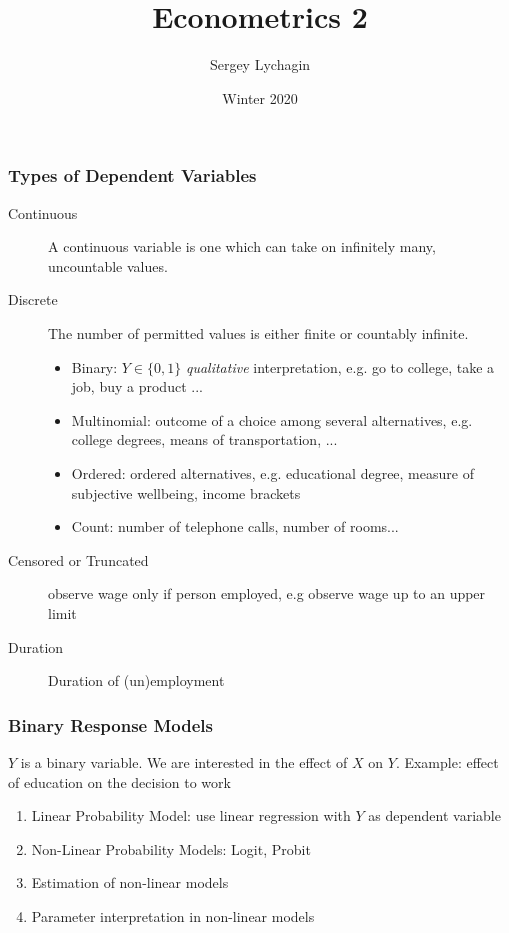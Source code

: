 \documentclass[pdftex]{beamer}
\title[Limited Dependent Variables]{Econometrics 2}
\author[Lychagin \& Mu\c co]{Sergey Lychagin}
\institute[CEU]{Central European University}
\date{Winter 2020}
\begin{document}
\frame{\titlepage}





\begin{frame}
\frametitle{Types of Dependent Variables}

\begin{description}
  \item[Continuous] A continuous variable is one which can take on infinitely many, uncountable values.
    \item[Discrete] The number of permitted values is either finite or countably infinite.
\begin{itemize}\scriptsize
  \item Binary: $Y \in \{0,1\}$ \emph{qualitative} interpretation, e.g. go to college, take a job, buy a product ...
  \item Multinomial: outcome of a choice among several alternatives, e.g. college degrees, means of transportation, ...
  \item Ordered:  ordered alternatives, e.g. educational degree, measure of subjective wellbeing, income brackets
  \item Count: number of telephone calls, number of rooms...
  \end{itemize}

  \item[Censored or Truncated] observe wage only if person employed, e.g  observe wage up to an upper limit
  \item[Duration] Duration of (un)employment
\end{description}
\end{frame}






\begin{frame}
\frametitle{Binary Response Models}

$Y$ is a binary variable. We are interested in the effect of $X$ on $Y$.
Example: effect of education on the decision to work

\begin{enumerate}
  \item Linear Probability Model: use linear regression with $Y$ as dependent variable
  \item Non-Linear Probability Models: Logit, Probit
  \item Estimation of non-linear models
  \item Parameter interpretation in non-linear models
\end{enumerate}

\end{frame}
\end{document}
